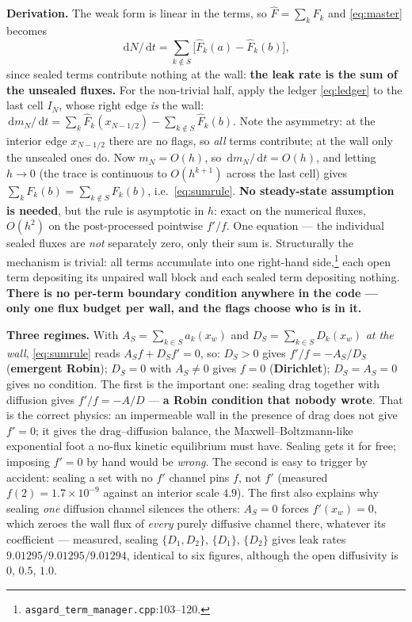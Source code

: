 \documentclass[10pt]{article}
\newcommand{\dd}{\,\mathrm{d}}
\newcommand{\hF}{\widehat{F}}
\newcommand{\fl}[2]{\texttt{#1}:#2}
\begin{document}
\textbf{Derivation.} The weak form is linear in the terms, so $\hF=\sum_k\hF_k$
and \eqref{eq:master} becomes
\begin{equation}
  \dd N/\dd t = \textstyle\sum_{k\notin S}\big[\hF_k(a)-\hF_k(b)\big],
  \label{eq:leak}
\end{equation}
since sealed terms contribute nothing at the wall: \textbf{the leak rate is the
sum of the unsealed fluxes.} For the non-trivial half, apply the ledger
\eqref{eq:ledger} to the last cell $I_N$, whose right edge \emph{is} the wall:
$\dd m_N/\dd t=\sum_k\hF_k(x_{N-1/2})-\sum_{k\notin S}\hF_k(b)$. Note the
asymmetry: at the interior edge $x_{N-1/2}$ there are no flags, so \emph{all}
terms contribute; at the wall only the unsealed ones do. Now $m_N=O(h)$, so
$\dd m_N/\dd t=O(h)$, and letting $h\to0$ (the trace is continuous to
$O(h^{k+1})$ across the last cell) gives $\sum_kF_k(b)=\sum_{k\notin S}F_k(b)$,
i.e.\ \eqref{eq:sumrule}. \textbf{No steady-state assumption is needed}, but the
rule is asymptotic in $h$: exact on the numerical fluxes, $O(h^2)$ on the
post-processed pointwise $f'/f$. One equation --- the individual sealed fluxes
are \emph{not} separately zero, only their sum is. Structurally the mechanism is
trivial: all terms accumulate into one right-hand
side,\footnote{\fl{asgard\_term\_manager.cpp}{103--120}.} each open term
depositing its unpaired wall block and each sealed term depositing nothing.
\textbf{There is no per-term boundary condition anywhere in the code --- only one
flux budget per wall, and the flags choose who is in it.}

\textbf{Three regimes.} With $A_S=\sum_{k\in S}a_k(x_w)$ and
$D_S=\sum_{k\in S}D_k(x_w)$ \emph{at the wall}, \eqref{eq:sumrule} reads
$A_Sf+D_Sf'=0$, so: $D_S>0$ gives $f'/f=-A_S/D_S$ (\textbf{emergent Robin});
$D_S=0$ with $A_S\ne0$ gives $f=0$ (\textbf{Dirichlet}); $D_S=A_S=0$ gives no
condition. The first is the important one: sealing drag together with diffusion
gives $f'/f=-A/D$ --- \textbf{a Robin condition that nobody wrote}. That is the
correct physics: an impermeable wall in the presence of drag does not give
$f'=0$; it gives the drag--diffusion balance, the Maxwell--Boltzmann-like
exponential foot a no-flux kinetic equilibrium must have. Sealing gets it for
free; imposing $f'=0$ by hand would be \emph{wrong}. The second is easy to
trigger by accident: sealing a set with no $f'$ channel pins $f$, not $f'$
(measured $f(2)=1.7\times10^{-9}$ against an interior scale $4.9$). The first also
explains why sealing \emph{one} diffusion channel silences the others: $A_S=0$
forces $f'(x_w)=0$, which zeroes the wall flux of \emph{every} purely diffusive
channel there, whatever its coefficient --- measured, sealing $\{D_1,D_2\}$,
$\{D_1\}$, $\{D_2\}$ gives leak rates $9.01295/9.01295/9.01294$, identical to six
figures, although the open diffusivity is $0$, $0.5$, $1.0$.
\end{document}
